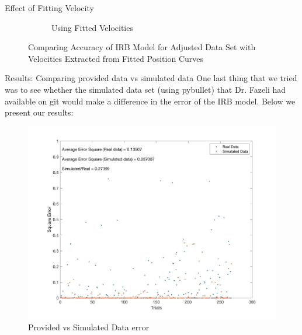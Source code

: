 \begin{frame}{Effect of Fitting Velocity}
\begin{figure}[h!]
\begin{subfigure}[b]{0.45\linewidth}
                \caption{Using Fitted Velocities}
                \label{fig:UpdatedSD}
        \end{subfigure}
        \caption{Comparing Accuracy of IRB Model for Adjusted Data Set with Velocities Extracted from Fitted Position Curves}
    \end{figure}

\end{frame}

\begin{frame}{Results: Comparing provided data vs simulated data}
 \vspace{0.5\baselineskip}
One last thing that we tried was to see whether the simulated data set (using pybullet) that Dr. Fazeli had available on git would make a difference in the error of the IRB model. Below we present our results:

\begin{figure}
    \centering
    \includegraphics[scale=0.14]{figures/SquareDataErrorSimulated.jpg}
    \caption{Provided vs Simulated Data error}
    \label{fig:MomentsError}
\end{figure}

\end{frame}